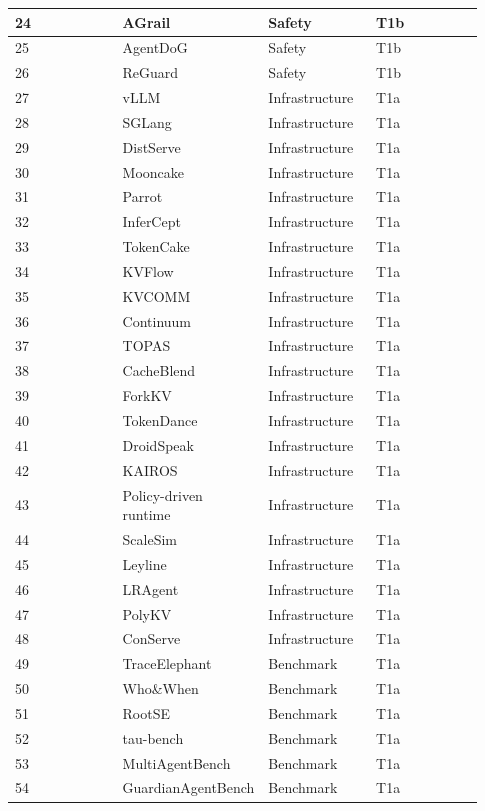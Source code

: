 \documentclass[preprint,12pt]{elsarticle}
\begin{document}
\begin{center}
\begin{longtable}{|p{0.233\linewidth}|p{0.233\linewidth}|p{0.233\linewidth}|p{0.233\linewidth}|}
24 & AGrail & Safety & T1b \\ \hline
25 & AgentDoG & Safety & T1b \\ \hline
26 & ReGuard & Safety & T1b \\ \hline
27 & vLLM & Infrastructure & T1a \\ \hline
28 & SGLang & Infrastructure & T1a \\ \hline
29 & DistServe & Infrastructure & T1a \\ \hline
30 & Mooncake & Infrastructure & T1a \\ \hline
31 & Parrot & Infrastructure & T1a \\ \hline
32 & InferCept & Infrastructure & T1a \\ \hline
33 & TokenCake & Infrastructure & T1a \\ \hline
34 & KVFlow & Infrastructure & T1a \\ \hline
35 & KVCOMM & Infrastructure & T1a \\ \hline
36 & Continuum & Infrastructure & T1a \\ \hline
37 & TOPAS & Infrastructure & T1a \\ \hline
38 & CacheBlend & Infrastructure & T1a \\ \hline
39 & ForkKV & Infrastructure & T1a \\ \hline
40 & TokenDance & Infrastructure & T1a \\ \hline
41 & DroidSpeak & Infrastructure & T1a \\ \hline
42 & KAIROS & Infrastructure & T1a \\ \hline
43 & Policy-driven runtime & Infrastructure & T1a \\ \hline
44 & ScaleSim & Infrastructure & T1a \\ \hline
45 & Leyline & Infrastructure & T1a \\ \hline
46 & LRAgent & Infrastructure & T1a \\ \hline
47 & PolyKV & Infrastructure & T1a \\ \hline
48 & ConServe & Infrastructure & T1a \\ \hline
49 & TraceElephant & Benchmark & T1a \\ \hline
50 & Who\&When & Benchmark & T1a \\ \hline
51 & RootSE & Benchmark & T1a \\ \hline
52 & tau-bench & Benchmark & T1a \\ \hline
53 & MultiAgentBench & Benchmark & T1a \\ \hline
54 & GuardianAgentBench & Benchmark & T1a \\ \hline

\end{longtable}
\end{center}
\end{document}
